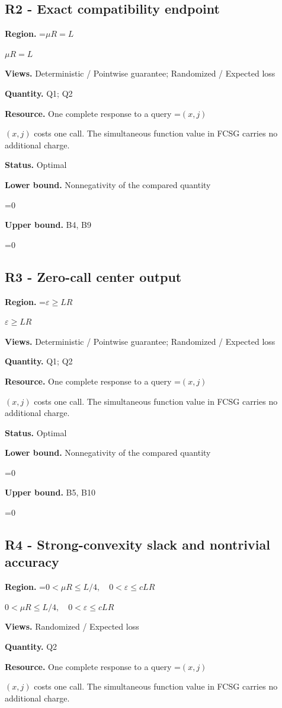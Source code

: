 \documentclass[10pt,a4paper]{article}
\newcommand{\AtlasMath}[1]{\par\begingroup\centering\setbox0=\hbox{$\displaystyle #1$}\ifdim\wd0>1.4\linewidth\typeout{ATLAS WIDE FORMULA: \the\wd0}\fi\ifdim\wd0>\linewidth\resizebox{\linewidth}{!}{\box0}\else\box0\fi\par\endgroup}
\newcommand{\AtlasInlineMath}[1]{\begingroup\setbox0=\hbox{$#1$}\ifdim\wd0>.4\linewidth\endgroup\AtlasMath{#1}\else\endgroup$#1$\fi}
\begin{document}
\subsection{R2 - Exact compatibility endpoint}
\textbf{Region.} \AtlasInlineMath{\mu R=L}

\textbf{Views.} Deterministic / Pointwise guarantee; Randomized / Expected loss

\textbf{Quantity.} Q1; Q2

\textbf{Resource.} One complete response to a query \AtlasInlineMath{(x,j)} costs one call. The simultaneous function value in FCSG carries no additional charge.

\textbf{Status.} Optimal

\textbf{Lower bound.} Nonnegativity of the compared quantity

\AtlasMath{0}
\textbf{Upper bound.} B4, B9

\AtlasMath{0}
\subsection{R3 - Zero-call center output}
\textbf{Region.} \AtlasInlineMath{\varepsilon\ge LR}

\textbf{Views.} Deterministic / Pointwise guarantee; Randomized / Expected loss

\textbf{Quantity.} Q1; Q2

\textbf{Resource.} One complete response to a query \AtlasInlineMath{(x,j)} costs one call. The simultaneous function value in FCSG carries no additional charge.

\textbf{Status.} Optimal

\textbf{Lower bound.} Nonnegativity of the compared quantity

\AtlasMath{0}
\textbf{Upper bound.} B5, B10

\AtlasMath{0}
\subsection{R4 - Strong-convexity slack and nontrivial accuracy}
\textbf{Region.} \AtlasInlineMath{0<\mu R\le L/4,\quad0<\varepsilon\le cLR}

\textbf{Views.} Randomized / Expected loss

\textbf{Quantity.} Q2

\textbf{Resource.} One complete response to a query \AtlasInlineMath{(x,j)} costs one call. The simultaneous function value in FCSG carries no additional charge.
\end{document}
